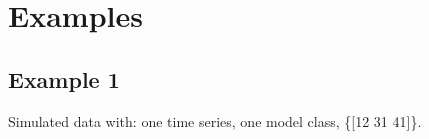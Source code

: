 \documentclass{book}
\begin{document}
%
%
%
%
%
%


\chapter{Examples}
\section{Example 1}
Simulated data with: one time series, one model class, \{[12 31 41]\}.
\end{document}
